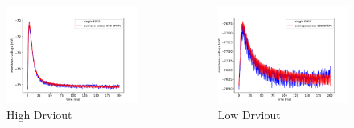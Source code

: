 \documentclass{beamer}
\begin{document}
\begin{frame}
	\begin{columns}
          	\begin{figure}
    				\centering
    				\includegraphics[width=\linewidth]{figures/epsp_out_+.pdf}
    				High Drviout
 		   \end{figure}


          \begin{figure}
    				\centering
    				\includegraphics[width=\linewidth]{figures/epsp_out_-.pdf}
    				Low Drviout
 		   \end{figure}


	\end{columns}

\end{frame}
\end{document}
